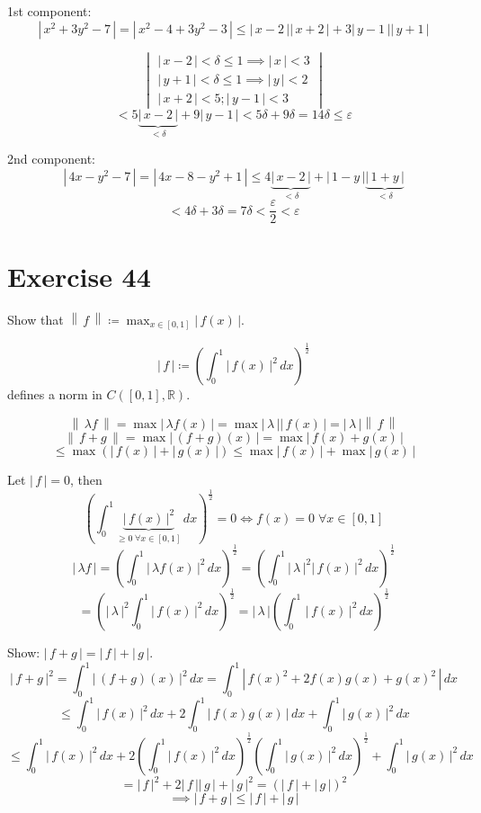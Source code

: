 \documentclass[a4paper]{article}
\theoremstyle{definition}
\newcommand\abs[1]{\left|\,#1\,\right|}
\newcommand\norm[1]{\left\|\,#1\,\right\|}
\begin{document}
1st component:
\[ \abs{x^2 + 3y^2 - 7} = \abs{x^2 - 4 + 3y^2 - 3} \leq \abs{x - 2} \abs{x + 2} + 3 \abs{y - 1} \abs{y + 1} \]

\[
  \begin{vmatrix}
    \abs{x - 2} < \delta \leq 1 \implies \abs{x} < 3 \\
    \abs{y + 1} < \delta \leq 1 \implies \abs{y} < 2 \\
    \abs{x + 2} < 5; \abs{y - 1} < 3
  \end{vmatrix}
\] \[
  < 5 \underbrace{\abs{x - 2}}_{<\delta} + 9 \abs{y - 1} < 5 \delta + 9 \delta = 14\delta \leq \varepsilon
\]

2nd component:
\[ \abs{4x - y^2 - 7} = \abs{4x - 8 - y^2 + 1} \leq 4 \underbrace{\abs{x - 2}}_{< \delta} + \abs{1 - y} \underbrace{\abs{1 + y}}_{<\delta} \]
\[ < 4\delta + 3\delta = 7\delta < \frac\varepsilon{2} < \varepsilon \]


\section{Exercise 44}

Show that $\norm{f} \coloneqq \max_{x \in [0,1]} \abs{f(x)}$.

\[ \abs{f} \coloneqq \left(\int_0^1 \abs{f(x)}^2 \, dx\right)^{\frac12} \]
defines a norm in $C([0,1], \mathbb R)$.

\[ \norm{\lambda f} = \max \abs{\lambda f(x)} = \max \abs{\lambda} \abs{f(x)} = \abs{\lambda} \norm{f} \]
\[ \norm{f+g} = \max\abs{(f + g)(x)} = \max\abs{f(x) + g(x)} \]
\[ \leq \max\left(\abs{f(x)} + \abs{g(x)}\right) \leq \max\abs{f(x)} + \max\abs{g(x)} \]

Let $\abs{f} = 0$, then
\[ \left(\int_0^1 \underbrace{\abs{f(x)}^2}_{\geq 0 \; \forall x \in [0,1]} \, dx\right)^{\frac12} = 0 \iff f(x) = 0 \; \forall x \in [0,1] \]
\[ \abs{\lambda f} = \left(\int_0^1 \abs{\lambda f(x)}^2 \, dx\right)^{\frac12}
= \left(\int_0^1 \abs{\lambda}^2 \abs{f(x)}^2 \, dx\right)^{\frac12} \]
\[
= \left(\abs{\lambda}^2 \int_0^1 \abs{f(x)}^2 \, dx\right)^{\frac12}
= \abs{\lambda} \left(\int_0^1 \, \abs{f(x)}^2 \, dx\right)^{\frac12}
\]

Show: $\abs{f + g} = \abs{f} + \abs{g}$.
\[
\abs{f + g}^2 = \int_0^1 \abs{(f + g)(x)}^2 \, dx
= \int_0^1 \abs{f(x)^2 + 2f(x) g(x) + g(x)^2} \, dx
\] \[
\leq \int_0^1 \abs{f(x)}^2 \, dx + 2 \int_0^1 \abs{f(x) g(x)} \, dx + \int_0^1 \abs{g(x)}^2 \, dx
\] \[
\leq \int_0^1 \abs{f(x)}^2 \, dx + 2 \left(\int_0^1 \abs{f(x)}^2 \, dx\right)^{\frac12} \left(\int_0^1 \abs{g(x)}^2 \, dx\right)^{\frac12} + \int_0^1 \abs{g(x)}^2 \, dx
\] \[
= \abs{f}^2 + 2 \abs{f} \abs{g} + \abs{g}^2 = (\abs{f} + \abs{g})^2
\] \[
\implies \abs{f + g} \leq \abs{f} + \abs{g}
\]
\end{document}
